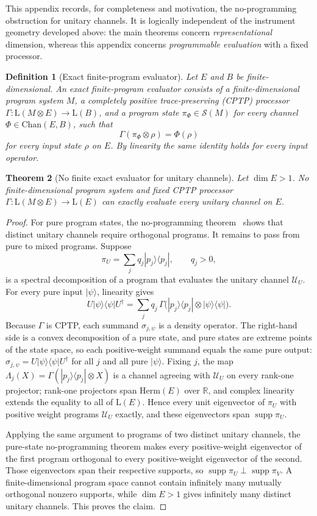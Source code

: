 \documentclass[11pt,a4paper]{article}
\newtheorem{theorem}{Theorem}[section]
\newtheorem{definition}[theorem]{Definition}
\newcommand{\Lin}{\mathrm{L}}
\newcommand{\Herm}{\mathrm{Herm}}
\newcommand{\Sstate}{\mathcal{S}}
\newcommand{\Chan}{\mathrm{Chan}}
\newcommand{\supp}{\operatorname{supp}}
\begin{document}
This appendix records, for completeness and motivation, the no-programming obstruction for unitary channels. It is logically independent of the instrument geometry developed above: the main theorems concern \emph{representational} dimension, whereas this appendix concerns \emph{programmable evaluation} with a fixed processor.

\begin{definition}[Exact finite-program evaluator]
Let $E$ and $B$ be finite-dimensional. An exact finite-program evaluator consists of a finite-dimensional program system $M$, a completely positive trace-preserving (CPTP) processor $\Gamma:\Lin(M\otimes E)\to\Lin(B)$, and a program state $\pi_\Phi\in\Sstate(M)$ for every channel $\Phi\in\Chan(E,B)$, such that
\[
\Gamma(\pi_\Phi\otimes\rho)=\Phi(\rho)
\]
for every input state $\rho$ on $E$. By linearity the same identity holds for every input operator.
\end{definition}

\begin{theorem}[No finite exact evaluator for unitary channels]
\label{thm:no-programming}
Let $\dim E>1$. No finite-dimensional program system and fixed CPTP processor $\Gamma:\Lin(M\otimes E)\to\Lin(E)$ can exactly evaluate every unitary channel on $E$.
\end{theorem}

\begin{proof}
For pure program states, the no-programming theorem~\cite{NielsenChuang1997} shows that distinct unitary channels require orthogonal programs. It remains to pass from pure to mixed programs. Suppose
\[
\pi_U=\sum_jq_j|p_j\rangle\langle p_j|,\qquad q_j>0,
\]
is a spectral decomposition of a program that evaluates the unitary channel $\mathcal U_U$. For every pure input $|\psi\rangle$, linearity gives
\[
U|\psi\rangle\langle\psi|U^\dagger
=\sum_jq_j\,\Gamma\big(|p_j\rangle\langle p_j|\otimes|\psi\rangle\langle\psi|\big).
\]
Because $\Gamma$ is CPTP, each summand $\sigma_{j,\psi}$ is a density operator. The right-hand side is a convex decomposition of a pure state, and pure states are extreme points of the state space, so each positive-weight summand equals the same pure output: $\sigma_{j,\psi}=U|\psi\rangle\langle\psi|U^\dagger$ for all $j$ and all pure $|\psi\rangle$. Fixing $j$, the map $\Lambda_j(X)=\Gamma(|p_j\rangle\langle p_j|\otimes X)$ is a channel agreeing with $\mathcal U_U$ on every rank-one projector; rank-one projectors span $\Herm(E)$ over $\mathbb R$, and complex linearity extends the equality to all of $\Lin(E)$. Hence every unit eigenvector of $\pi_U$ with positive weight programs $\mathcal U_U$ exactly, and these eigenvectors span $\supp\pi_U$.

Applying the same argument to programs of two distinct unitary channels, the pure-state no-programming theorem makes every positive-weight eigenvector of the first program orthogonal to every positive-weight eigenvector of the second. Those eigenvectors span their respective supports, so $\supp\pi_U\perp\supp\pi_V$. A finite-dimensional program space cannot contain infinitely many mutually orthogonal nonzero supports, while $\dim E>1$ gives infinitely many distinct unitary channels. This proves the claim.
\end{proof}
\end{document}
